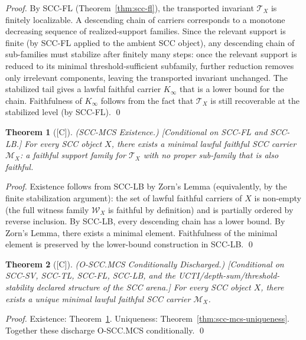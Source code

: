 \documentclass[12pt,oneside]{amsbook}
\theoremstyle{plain}
\newtheorem{theorem}{Theorem}[section]
\theoremstyle{definition}
\theoremstyle{remark}
\newcommand{\status}[1]{\textup{[#1]}}
\begin{document}
\begin{proof}
By SCC-FL (Theorem~\ref{thm:scc-fl}), the transported invariant
$\mathcal{T}_X$ is finitely localizable. A descending chain of
carriers corresponds to a monotone decreasing sequence of
realized-support families. Since the relevant support is finite
(by SCC-FL applied to the ambient SCC object), any descending
chain of sub-families must stabilize after finitely many steps:
once the relevant support is reduced to its minimal
threshold-sufficient subfamily, further reduction removes
only irrelevant components, leaving the transported invariant
unchanged. The stabilized tail gives a lawful faithful carrier
$K_\infty$ that is a lower bound for the chain. Faithfulness
of $K_\infty$ follows from the fact that $\mathcal{T}_X$ is
still recoverable at the stabilized level (by SCC-FL). \qed
\end{proof}

\begin{theorem}[\status{C}]\label{thm:scc-mcs-exists}
\textup{(SCC-MCS Existence.)}
\textup{[Conditional on SCC-FL and SCC-LB.]}
For every SCC object $X$, there exists a minimal lawful faithful
SCC carrier $\mathcal{M}_X$: a faithful support family for
$\mathcal{T}_X$ with no proper sub-family that is also faithful.
\end{theorem}

\begin{proof}
Existence follows from SCC-LB by Zorn's Lemma (equivalently,
by the finite stabilization argument): the set of lawful faithful
carriers of $X$ is non-empty (the full witness family
$\mathcal{W}_X$ is faithful by definition) and is partially
ordered by reverse inclusion. By SCC-LB, every descending chain
has a lower bound. By Zorn's Lemma, there exists a minimal
element. Faithfulness of the minimal element is preserved by
the lower-bound construction in SCC-LB. \qed
\end{proof}

\begin{theorem}[\status{C}]\label{thm:scc-mcs-full}
\textup{(O-SCC.MCS Conditionally Discharged.)}
\textup{[Conditional on SCC-SV, SCC-TL, SCC-FL, SCC-LB, and
the UCTI/depth-sum/threshold-stability declared structure of the
SCC arena.]}
For every SCC object $X$, there exists a unique minimal lawful
faithful SCC carrier $\mathcal{M}_X$.
\end{theorem}

\begin{proof}
Existence: Theorem~\ref{thm:scc-mcs-exists}.
Uniqueness: Theorem~\ref{thm:scc-mcs-uniqueness}.
Together these discharge O-SCC.MCS conditionally. \qed
\end{proof}
\end{document}
